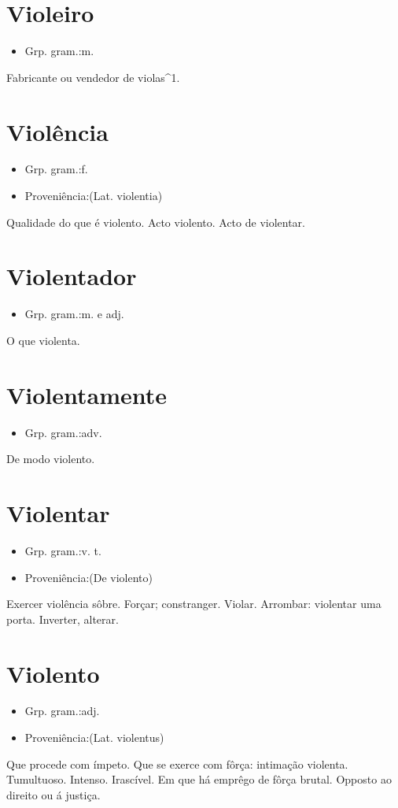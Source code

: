 \documentclass{article}
\begin{document}
\section{Violeiro}
\begin{itemize}
\item {Grp. gram.:m.}
\end{itemize}
Fabricante ou vendedor de violas^1.
\section{Violência}
\begin{itemize}
\item {Grp. gram.:f.}
\end{itemize}
\begin{itemize}
\item {Proveniência:(Lat. \textunderscore violentia\textunderscore )}
\end{itemize}
Qualidade do que é violento.
Acto violento.
Acto de violentar.
\section{Violentador}
\begin{itemize}
\item {Grp. gram.:m.  e  adj.}
\end{itemize}
O que violenta.
\section{Violentamente}
\begin{itemize}
\item {Grp. gram.:adv.}
\end{itemize}
De modo violento.
\section{Violentar}
\begin{itemize}
\item {Grp. gram.:v. t.}
\end{itemize}
\begin{itemize}
\item {Proveniência:(De \textunderscore violento\textunderscore )}
\end{itemize}
Exercer violência sôbre.
Forçar; constranger.
Violar.
Arrombar: \textunderscore violentar uma porta\textunderscore .
Inverter, alterar.
\section{Violento}
\begin{itemize}
\item {Grp. gram.:adj.}
\end{itemize}
\begin{itemize}
\item {Proveniência:(Lat. \textunderscore violentus\textunderscore )}
\end{itemize}
Que procede com ímpeto.
Que se exerce com fôrça: \textunderscore intimação violenta\textunderscore .
Tumultuoso.
Intenso.
Irascível.
Em que há emprêgo de fôrça brutal.
Opposto ao direito ou á justiça.
\end{document}
